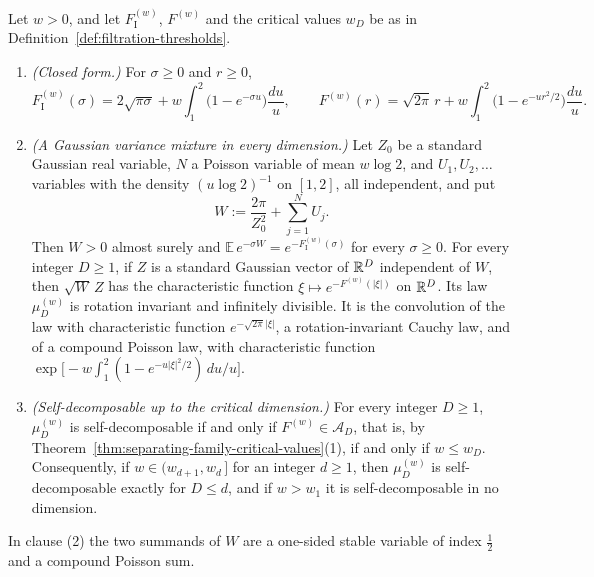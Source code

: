 \begin{proposition}\label{prop:separating-family-mixtures}
Let $w > 0$, and let $F^{(w)}_{\mathrm I}$, $F^{(w)}$ and the critical values $w_D$ be as in
Definition~\ref{def:filtration-thresholds}.
\begin{enumerate}
\item \emph{(Closed form.)} For $\sigma \ge 0$ and $r \ge 0$,
\[
  F^{(w)}_{\mathrm I}(\sigma) = 2\sqrt{\pi\sigma} + w\int_1^2\bigl(1 - e^{-\sigma u}\bigr)\frac{du}{u},
  \qquad
  F^{(w)}(r) = \sqrt{2\pi}\,r + w\int_1^2\bigl(1 - e^{-u r^2/2}\bigr)\frac{du}{u} .
\]
\item \emph{(A Gaussian variance mixture in every dimension.)} Let $Z_0$ be a standard Gaussian
real variable, $N$ a Poisson variable of mean $w\log 2$, and $U_1, U_2, \dots$ variables with the
density $(u\log 2)^{-1}$ on $[1,2]$, all independent, and put
\[
  W := \frac{2\pi}{Z_0^2} + \sum_{j=1}^{N}U_j .
\]
Then $W > 0$ almost surely and $\mathbb{E}\,e^{-\sigma W} = e^{-F^{(w)}_{\mathrm I}(\sigma)}$ for
every $\sigma \ge 0$. For every integer $D \ge 1$, if $Z$ is a standard Gaussian vector of
$\mathbb{R}^D$ independent of $W$, then $\sqrt W\,Z$ has the characteristic function
$\xi \mapsto e^{-F^{(w)}(|\xi|)}$ on $\mathbb{R}^D$. Its law $\mu^{(w)}_D$ is rotation invariant and
infinitely divisible. It is the convolution of the law with characteristic function
$e^{-\sqrt{2\pi}|\xi|}$, a rotation-invariant Cauchy law, and of a compound Poisson law, with
characteristic function $\exp\bigl[-w\int_1^2(1 - e^{-u|\xi|^2/2})\,du/u\bigr]$.
\item \emph{(Self-decomposable up to the critical dimension.)} For every integer $D \ge 1$,
$\mu^{(w)}_D$ is self-decomposable if and only if $F^{(w)} \in \mathcal{A}_D$, that is, by
Theorem~\ref{thm:separating-family-critical-values}(1), if and only if $w \le w_D$. Consequently, if
$w \in (w_{d+1}, w_d\,]$ for an integer
$d \ge 1$, then $\mu^{(w)}_D$ is self-decomposable exactly for $D \le d$, and if $w > w_1$ it is
self-decomposable in no dimension.
\end{enumerate}
\end{proposition}

In clause (2) the two summands of $W$ are a one-sided stable variable of index $\tfrac12$ and a
compound Poisson sum.

